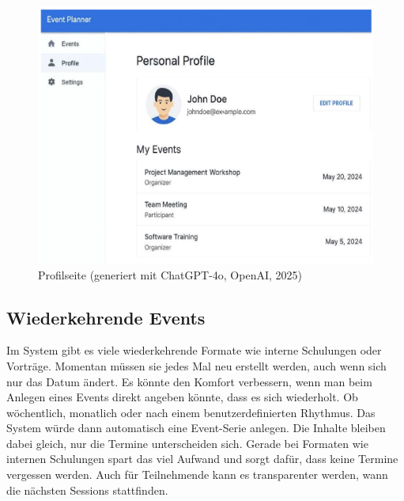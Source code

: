 \documentclass[a4paper,12pt]{article}
\begin{document}
\begin{figure}[H]
    \centering
    \includegraphics[width=1\textwidth]{Abbildungen/profilseite.png}
    \caption{Profilseite (generiert mit ChatGPT-4o, OpenAI, 2025)}
    \label{fig:profilseite}
\end{figure}

\newpage


\subsection{Wiederkehrende Events}

Im System gibt es viele wiederkehrende Formate wie interne Schulungen oder Vorträge. Momentan müssen sie jedes Mal neu erstellt werden, auch wenn sich nur das Datum ändert. Es könnte den Komfort verbessern, wenn man beim Anlegen eines Events direkt angeben könnte, dass es sich wiederholt. Ob wöchentlich, monatlich oder nach einem benutzerdefinierten Rhythmus. Das System würde dann automatisch eine Event-Serie anlegen. Die Inhalte bleiben dabei gleich, nur die Termine unterscheiden sich. Gerade bei Formaten wie internen Schulungen spart das viel Aufwand und sorgt dafür, dass keine Termine vergessen werden. Auch für Teilnehmende kann es transparenter werden, wann die nächsten Sessions stattfinden.
\end{document}
